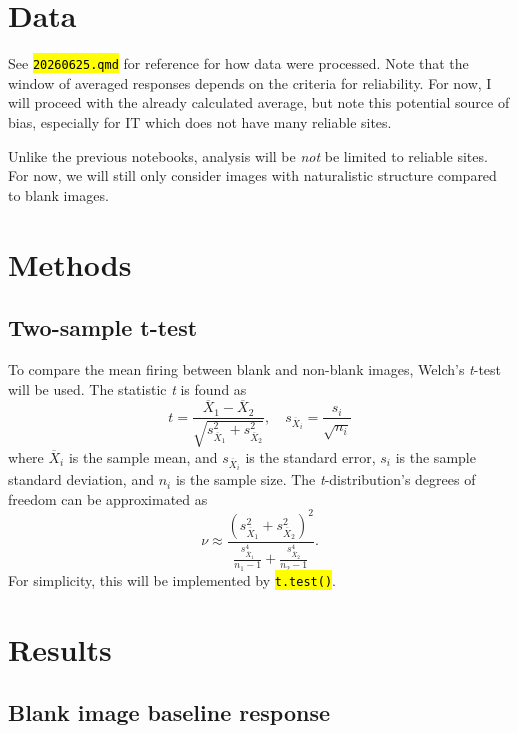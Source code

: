 \documentclass[
  10pt,
  letterpaper,
  DIV=11,
  numbers=noendperiod]{scrartcl}
\let\OldTexttt\texttt
\renewcommand{\texttt}[1]{\OldTexttt{\hl{#1}}}
\begin{document}
\section{Data}\label{data}

See \texttt{20260625.qmd} for reference for how data were processed.
Note that the window of averaged responses depends on the criteria for
reliability. For now, I will proceed with the already calculated
average, but note this potential source of bias, especially for IT which
does not have many reliable sites.

Unlike the previous notebooks, analysis will be \emph{not} be limited to
reliable sites. For now, we will still only consider images with
naturalistic structure compared to blank images.

\section{Methods}\label{methods}

\subsection{Two-sample t-test}\label{two-sample-t-test}

To compare the mean firing between blank and non-blank images, Welch's
\emph{t}-test will be used. The statistic \emph{t} is found as \[
t = \frac
{ \overline{X}_1 - \overline{X}_2 }
{ \sqrt{s^2_{\overline{X}_1} + s^2_{\overline{X}_2}} }, 
\quad 
s_{\overline{X}_i} = \frac{s_i}{\sqrt{n_i}}
\] where \(\overline{X}_i\) is the sample mean, and
\(s_{\overline{X}_i}\) is the standard error, \(s_i\) is the sample
standard deviation, and \(n_i\) is the sample size. The
\emph{t}-distribution's degrees of freedom can be approximated as \[
\nu \approx \frac
{ \left( s^2_{\overline{X}_1} + s^2_{\overline{X}_2} \right)^2 }
{ \frac{s^4_{\overline{X}_1}}{n_1 - 1} + \frac{s^4_{\overline{X}_2}}{n_2 - 1} }.
\] For simplicity, this will be implemented by \texttt{t.test()}.

\section{Results}\label{results}

\subsection{Blank image baseline
response}\label{blank-image-baseline-response}
\end{document}
